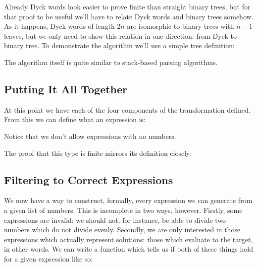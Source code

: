 Already Dyck words look easier to prove finite than straight binary trees, but
for that proof to be useful we'll have to relate Dyck words and binary trees
somehow.
As it happens, Dyck words of length \(2n\) are isomorphic to binary trees with
\(n-1\) leaves, but we only need to show this relation in one direction: from
Dyck to binary tree.
To demonstrate the algorithm we'll use a simple tree definition:
\begin{agdalisting*}
\end{agdalisting*}
The algorithm itself is quite similar to stack-based parsing algorithms.
\begin{agdalisting*}
\end{agdalisting*}
\subsection{Putting It All Together}
At this point we have each of the four components of the transformation defined.
From this we can define what an expression is:
\begin{agdalisting*}
\end{agdalisting*}
Notice that we don't allow expressions with no numbers.

The proof that this type is finite mirrors its definition closely:
\begin{agdalisting*}
\end{agdalisting*}
\subsection{Filtering to Correct Expressions}
We now have a way to construct, formally, every expression we can generate from
a given list of numbers.
This is incomplete in two ways, however.
Firstly, some expressions are invalid: we should not, for instance, be able to
divide two numbers which do not divide evenly.
Secondly, we are only interested in those expressions which actually represent
solutions: those which evaluate to the target, in other words.
We can write a function which tells us if both of these things hold for a given
expression like so:

\begin{minipage}{\linewidth}
  \begin{multicols}{2}
    \begin{agdalisting*}
    \end{agdalisting*} \columnbreak
    \begin{agdalisting*}
    \end{agdalisting*}
  \end{multicols} \vspace{\baselineskip}
\end{minipage}

